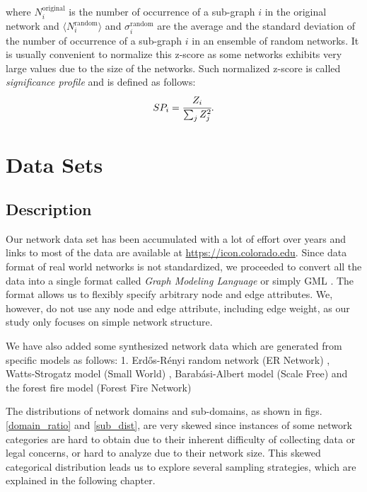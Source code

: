 \documentclass{article}
\begin{document}
where $N_i^{\text{original}}$ is the number of occurrence of a sub-graph $i$ in the original network and $ \langle N_i^{\text{random}} \rangle$ and $\sigma_i^{\text{random}}$ are the average and the standard deviation of the number of occurrence of a sub-graph $i$ in an ensemble of random networks. It is usually convenient to normalize this z-score as some networks exhibits very large values due to the size of the networks. Such normalized z-score is called \textit{significance profile} and is defined as follows:
	\begin{equation}
	SP_i = \cfrac{Z_i}{\sum_j Z_j^2}.
	\end{equation}

\section{Data Sets}
	\subsection{Description}	
	Our network data set has been accumulated with a lot of effort over years and links to most of the data are available at \url{https://icon.colorado.edu}.
	Since data format of real world networks is not standardized, we proceeded to convert all the data into a single format called \textit{Graph Modeling Language} or simply GML \cite{GML}. The format allows us to flexibly specify arbitrary node and edge attributes. We, however, do not use any node and edge attribute, including edge weight, as our study only focuses on simple network structure.
	
	We have also added some synthesized network data which are generated from specific models as follows: 1. Erd\H{o}s-R\'enyi random network (ER Network) \cite{ER_Network}, Watts-Strogatz model (Small World) \cite{watts1998cds}, Barab\'asi-Albert model (Scale Free) \cite{Barabasi99emergenceScaling} and the forest fire model (Forest Fire Network) \cite{ForestFire}
	
	The distributions of network domains and sub-domains, as shown in figs.\ref{domain_ratio} and \ref{sub_dist}, are very skewed since instances of some network categories are hard to obtain due to their inherent difficulty of collecting data or legal concerns, or hard to analyze due to their network size. This skewed categorical distribution leads us to explore several sampling strategies, which are explained in the following chapter.
	
\end{document}

